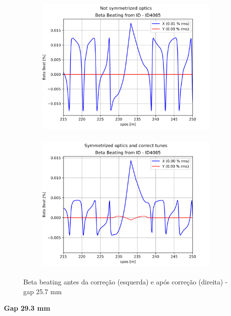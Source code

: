 \documentclass[a4paper,12pt]{article}
\begin{document}
\begin{figure}[H]
\begin{subfigure}{0.5\textwidth}
\includegraphics[width=0.9\linewidth, height=7cm]{figs/phase16 gap25 uncorrected-optics.png} 
\label{fig:subim11625}
\end{subfigure}
\begin{subfigure}{0.5\textwidth}
\includegraphics[width=0.9\linewidth, height=7cm]{figs/phase16 gap25 corrected-optics-tunes.png}
\label{fig:subim21625}
\end{subfigure}
\caption{Beta beating antes da correção (esquerda) e após correção (direita) - gap 25.7 mm}
\label{fig:bb16_25}
\end{figure}

\textbf{Gap 29.3 mm} \\
\end{document}
